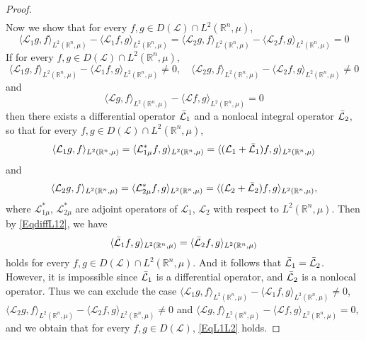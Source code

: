 \documentclass[10pt]{article}
\theoremstyle{definition}
\theoremstyle{remark}
\numberwithin{equation}{section}
\begin{document}
\begin{proof}
\begin{align*}
\end{align*}
Now we show that for every $f,g \in D(\mathcal{L}) \cap L^2(\mathbb{R}^n, \mu)$,
\begin{equation}\label{EqL1L2}
    \langle \mathcal{L}_{1}g,f\rangle_{L^2(\mathbb{R}^n, \mu)} - \langle \mathcal{L}_{1}f,g\rangle_{L^2(\mathbb{R}^n, \mu)} = \langle \mathcal{L}_{2}g,f\rangle_{L^2(\mathbb{R}^n, \mu)} - \langle \mathcal{L}_{2}f,g\rangle_{L^2(\mathbb{R}^n, \mu)}  = 0
\end{equation}
If for every $f,g\in D(\mathcal{L}) \cap L^2(\mathbb{R}^n, \mu)$, 
\begin{equation*}
    \langle \mathcal{L}_{1}g,f\rangle_{L^2(\mathbb{R}^n, \mu)} - \langle \mathcal{L}_{1}f,g\rangle_{L^2(\mathbb{R}^n, \mu)} \neq 0, \quad \langle \mathcal{L}_{2}g,f\rangle_{L^2(\mathbb{R}^n, \mu)} - \langle \mathcal{L}_{2}f,g\rangle_{L^2(\mathbb{R}^n, \mu)} \neq 0
\end{equation*}
and 
\begin{equation}\label{EqdiffL12}
    \langle \mathcal{L}g,f\rangle_{L^2(\mathbb{R}^n, \mu)} - \langle \mathcal{L}f,g\rangle_{L^2(\mathbb{R}^n, \mu)} = 0
\end{equation}
then there exists a differential operator $\Bar{\mathcal{L}}_1$ and a nonlocal integral operator $\Bar{\mathcal{L}}_2$, so that for every $f,g\in D(\mathcal{L}) \cap L^2(\mathbb{R}^n, \mu)$,
\begin{equation*}
    \langle \mathcal{L}_{1}g,f\rangle_{L^2(\mathbb{R}^n, \mu)} = \langle \mathcal{L}^{\ast}_{1\mu}f,g\rangle_{L^2(\mathbb{R}^n, \mu)} = \langle (\mathcal{L}_{1} + \Bar{\mathcal{L}}_1)f,g\rangle_{L^2(\mathbb{R}^n, \mu)}
\end{equation*}
and 
\begin{equation*}
    \langle \mathcal{L}_{2}g,f\rangle_{L^2(\mathbb{R}^n, \mu)} = \langle \mathcal{L}^{\ast}_{2\mu}f,g\rangle_{L^2(\mathbb{R}^n, \mu)} = \langle (\mathcal{L}_{2} + \Bar{\mathcal{L}}_2)f,g\rangle_{L^2(\mathbb{R}^n, \mu)},
\end{equation*}
where $\mathcal{L}^{\ast}_{1\mu}$, $\mathcal{L}^{\ast}_{2\mu}$ are adjoint operators of $\mathcal{L}_1$, $\mathcal{L}_2$ with
respect to $L^2(\mathbb{R}^n, \mu)$.
Then by \eqref{EqdiffL12}, we have
\begin{equation*}
    \langle \Bar{\mathcal{L}}_1 f,g\rangle_{L^2(\mathbb{R}^n, \mu)} = \langle \Bar{\mathcal{L}}_2f,g\rangle_{L^2(\mathbb{R}^n, \mu)}
\end{equation*}
holds for every $f,g\in D(\mathcal{L}) \cap L^2(\mathbb{R}^n, \mu)$.
And it follows that $\Bar{\mathcal{L}}_1 = \Bar{\mathcal{L}}_2$.
However, it is impossible since $\Bar{\mathcal{L}}_1$ is a differential operator, and $\Bar{\mathcal{L}}_2$ is a nonlocal operator.
Thus we can exclude the case $\langle \mathcal{L}_{1}g,f\rangle_{L^2(\mathbb{R}^n, \mu)} - \langle \mathcal{L}_{1}f,g\rangle_{L^2(\mathbb{R}^n, \mu)} \neq 0$,  $\langle \mathcal{L}_{2}g,f\rangle_{L^2(\mathbb{R}^n, \mu)} - \langle \mathcal{L}_{2}f,g\rangle_{L^2(\mathbb{R}^n, \mu)} \neq 0$ and $\langle \mathcal{L}g,f\rangle_{L^2(\mathbb{R}^n, \mu)} - \langle \mathcal{L}f,g\rangle_{L^2(\mathbb{R}^n, \mu)} = 0$, and we obtain that for every $f,g \in D(\mathcal{L})$, \eqref{EqL1L2} holds. 


\end{proof}
\end{document}
